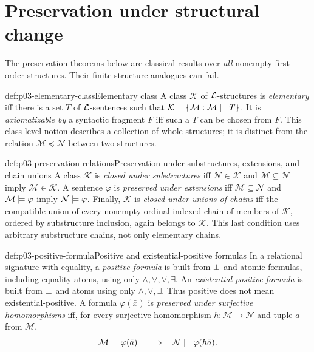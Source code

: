 \section{Preservation under structural change}
\label{sec:p03-preservation}

The preservation theorems below are classical results over \emph{all}
nonempty first-order structures.  Their finite-structure analogues can fail.

\begin{hbdefinition}{def:p03-elementary-class}{Elementary class}
A class \(\mathcal K\) of \(\mathcal{L}\)-structures is \emph{elementary} iff there
is a set \(T\) of \(\mathcal{L}\)-sentences such that
\(\mathcal K=\{\mathcal M:\mathcal M\models T\}\).  It is
\emph{axiomatizable by} a syntactic fragment \(F\) iff such a \(T\) can be
chosen from \(F\).  This class-level notion describes a collection of whole
structures; it is distinct from the relation
\(\mathcal M\preccurlyeq\mathcal N\) between two structures.
\end{hbdefinition}

\begin{hbdefinition}{def:p03-preservation-relations}{Preservation under substructures, extensions, and chain unions}
A class \(\mathcal K\) is \emph{closed under substructures} iff
\(\mathcal N\in\mathcal K\) and \(\mathcal M\subseteq\mathcal N\) imply
\(\mathcal M\in\mathcal K\).  A sentence \(\varphi\) is
\emph{preserved under extensions} iff
\(\mathcal M\subseteq\mathcal N\) and
\(\mathcal M\models\varphi\) imply
\(\mathcal N\models\varphi\).  Finally, \(\mathcal K\) is
\emph{closed under unions of chains} iff the compatible union of every
nonempty ordinal-indexed chain of members of \(\mathcal K\), ordered by
substructure inclusion, again belongs to \(\mathcal K\).  This last condition
uses arbitrary substructure chains, not only elementary chains.
\end{hbdefinition}

\begin{hbdefinition}{def:p03-positive-formula}{Positive and existential-positive formulas}
In a relational signature with equality, a \emph{positive formula} is built
from \(\bot\) and atomic formulas, including equality atoms, using only
\(\land,\lor,\forall,\exists\).  An \emph{existential-positive formula} is
built from \(\bot\) and atoms using only \(\land,\lor,\exists\).  Thus
positive does not mean
existential-positive.  A formula \(\varphi(\bar x)\) is
\emph{preserved under surjective homomorphisms} iff, for every surjective
homomorphism \(h:\mathcal M\to\mathcal N\) and tuple \(\bar a\) from
\(\mathcal M\),
\[
 \mathcal M\models\varphi(\bar a)
 \quad\Longrightarrow\quad
 \mathcal N\models\varphi(h\bar a).
\]
\end{hbdefinition}

